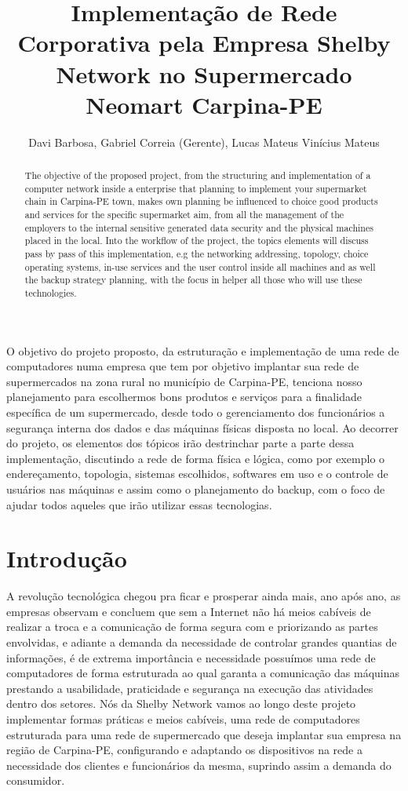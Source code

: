 \documentclass[12pt]{article}
\title{Implementação de Rede Corporativa pela Empresa Shelby Network no Supermercado Neomart Carpina-PE}
\author{Davi Barbosa\inst{1}, Gabriel Correia (Gerente)\inst{2}, Lucas Mateus\inst{3} Vinícius Mateus\inst{4}}
\begin{document}
 

\maketitle

\begin{abstract}
  The objective of the proposed project, from the structuring and implementation of a computer network inside a enterprise that planning to implement your supermarket chain in Carpina-PE town, makes own planning be influenced to choice good products and services for the specific supermarket aim, from all the management of the employers to the internal sensitive generated data security and the physical machines placed in the local. Into the workflow of the project, the topics elements will discuss pass by pass of this implementation, e.g the networking addressing, topology, choice operating systems, in-use services and the user control inside all machines and as well the backup strategy planning, with the focus in helper all those who will use these technologies.
\end{abstract}
     
\begin{resumo} 
  O objetivo do projeto proposto, da estruturação e implementação de uma rede de computadores numa empresa que tem por objetivo implantar sua rede de supermercados na zona rural no município de Carpina-PE, tenciona nosso planejamento para escolhermos bons produtos e serviços para a finalidade específica de um supermercado, desde todo o gerenciamento dos funcionários a segurança interna dos dados e das máquinas físicas disposta no local. Ao decorrer do projeto, os elementos dos tópicos irão destrinchar parte a parte dessa implementação, discutindo a rede de forma física e lógica, como por exemplo o endereçamento, topologia, sistemas escolhidos, softwares em uso e o controle de usuários nas máquinas e assim como o planejamento do backup, com o foco de ajudar todos aqueles que irão utilizar essas tecnologias.
\end{resumo}

\section{Introdução}
A revolução tecnológica chegou pra ficar e prosperar ainda mais, ano após ano, as empresas observam e concluem que sem a Internet não há meios cabíveis de realizar a troca e a comunicação de forma segura com e priorizando as partes envolvidas, e adiante a demanda da necessidade de controlar grandes quantias de informações, é de extrema importância e necessidade possuímos uma rede de computadores de forma estruturada ao qual garanta a comunicação das máquinas prestando a usabilidade, praticidade e segurança na execução das atividades dentro dos setores. Nós da Shelby Network vamos ao longo deste projeto implementar formas práticas e meios cabíveis, uma rede de computadores estruturada para uma rede de supermercado que deseja implantar sua empresa na região de Carpina-PE, configurando e adaptando os dispositivos na rede a necessidade dos clientes e funcionários da mesma, suprindo assim a demanda do consumidor.
\end{document}
